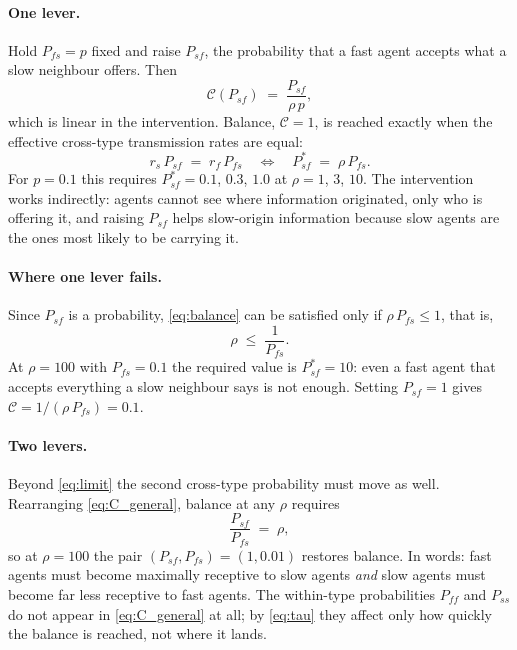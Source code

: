 \documentclass{article}
\newcommand{\Pab}[2]{P_{#1#2}}      %
\newcommand{\Cidx}{\mathcal{C}}      %
\begin{document}
\paragraph{One lever.} Hold $\Pab{f}{s} = p$ fixed and raise $\Pab{s}{f}$, the probability that a fast agent accepts what a slow neighbour offers. Then
\begin{equation}
\Cidx(\Pab{s}{f}) \;=\; \frac{\Pab{s}{f}}{\rho\, p},
\label{eq:C_intervention}
\end{equation}
which is linear in the intervention. Balance, $\Cidx = 1$, is reached exactly when the effective cross-type transmission rates are equal:
\begin{equation}
r_s\, \Pab{s}{f} \;=\; r_f\, \Pab{f}{s}
\quad\Longleftrightarrow\quad
\Pab{s}{f}^{\ast} \;=\; \rho\, \Pab{f}{s}.
\label{eq:balance}
\end{equation}
For $p = 0.1$ this requires $\Pab{s}{f}^\ast = 0.1$, $0.3$, $1.0$ at $\rho = 1$, $3$, $10$. The intervention works indirectly: agents cannot see where information originated, only who is offering it, and raising $\Pab{s}{f}$ helps slow-origin information because slow agents are the ones most likely to be carrying it.

\paragraph{Where one lever fails.} Since $\Pab{s}{f}$ is a probability, \eqref{eq:balance} can be satisfied only if $\rho\, \Pab{f}{s} \leq 1$, that is,
\begin{equation}
\rho \;\leq\; \frac{1}{\Pab{f}{s}}.
\label{eq:limit}
\end{equation}
At $\rho = 100$ with $\Pab{f}{s} = 0.1$ the required value is $\Pab{s}{f}^\ast = 10$: even a fast agent that accepts everything a slow neighbour says is not enough. Setting $\Pab{s}{f} = 1$ gives $\Cidx = 1/(\rho\, \Pab{f}{s}) = 0.1$.

\paragraph{Two levers.} Beyond \eqref{eq:limit} the second cross-type probability must move as well. Rearranging \eqref{eq:C_general}, balance at any $\rho$ requires
\begin{equation}
\frac{\Pab{s}{f}}{\Pab{f}{s}} \;=\; \rho,
\label{eq:two_levers}
\end{equation}
so at $\rho = 100$ the pair $(\Pab{s}{f}, \Pab{f}{s}) = (1, 0.01)$ restores balance. In words: fast agents must become maximally receptive to slow agents \emph{and} slow agents must become far less receptive to fast agents. The within-type probabilities $\Pab{f}{f}$ and $\Pab{s}{s}$ do not appear in \eqref{eq:C_general} at all; by \eqref{eq:tau} they affect only how quickly the balance is reached, not where it lands.
\end{document}
